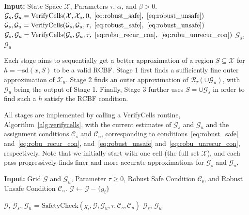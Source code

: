 \documentclass[letterpaper, 10 pt, conference]{ieeeconf}
\newcommand{\X}{\mathcal{X}}
\newcommand{\R}{\mathcal{R}}
\begin{document}
\begin{algorithm}[H]
\caption{VerifyRegion($\mathcal{X}, \tau$, $\alpha$, $\beta$)}
\label{alg:verifyregion}
\begin{algorithmic}[1]
\State \textbf{Input:} State Space $\mathcal{X}$, Parameters $\tau$, $\alpha$, and $\beta > 0$. 
\State $\mathcal{G}_{s}, \mathcal{G}_{u} = \mathrm{VerifyCells}(\mathcal{X}, \mathcal{X}_{u}, 0, ~\eqref{eq:robust_safe}, ~\eqref{eq:robust_unsafe})$
\State $\mathcal{G}_{s}, \mathcal{G}_{u} = \mathrm{VerifyCells}(\mathcal{G}_{s}, \mathcal{G}_{u}, \tau, ~\eqref{eq:robust_safe}, ~\eqref{eq:robust_unsafe})$
\State $\mathcal{G}_{s}, \mathcal{G}_{u} = \mathrm{VerifyCells}(\mathcal{G}_{s}, \mathcal{G}_{u}, \tau, ~\eqref{eq:robu_recur_con}, ~\eqref{eq:robu_unrecur_con})$
\State \Return $\mathcal{G}_{s}$, $\mathcal{G}_{u}$
\end{algorithmic}
\end{algorithm}
Each stage aims to sequentially get a better approximation of a region $S \subseteq \mathcal{X}$ for $h=-\mathrm{sd}(x,S)$ to be a valid RCBF.
Stage 1 first finds a sufficiently fine outer approximation of $\X_u$. Stage 2 finds an outer approximation of $\R_\tau(\cup \mathcal{G}_u)$, with $\mathcal{G}_u$ being the output of Stage 1. Finally, Stage 3 further uses $S = \cup \mathcal{G}_s$ in order to find such a $h$ satisfy the RCBF condition. 

All stages are implemented by calling a VerifyCells routine, Algorithm~\ref{alg:verifycells}, with the current estimates of $\mathcal{G}_s$ and $\mathcal{G}_u$ and the assignment conditions $\mathcal{C}_s$ and $\mathcal{C}_u$, corresponding to conditions~\eqref{eq:robust_safe} and~\eqref{eq:robu_recur_con}, and~\eqref{eq:robust_unsafe} and~\ref{eq:robu_unrecur_con}, respectively. Note that we initially start with one cell (the full set $\X$), and each pass progressively finds finer and more accurate approximations for $\mathcal{G}_s$ and $\mathcal{G}_u$.

\begin{algorithm}[htbp]
\caption{VerifyCells($\mathcal{G}, \mathcal{G}_{u}, \tau, \mathcal{C}_{\mathrm{s}},\mathcal{C}_{\mathrm{u}}$)}
\label{alg:verifycells}
\begin{algorithmic}[1]
\State \textbf{Input:} Grid $\mathcal{G}$ and $\mathcal{G}_{u}$, Parameter $\tau \ge 0$, Robust Safe Condition $\mathcal{C}_{\mathrm{s}}$, and Robust Unsafe Condition $\mathcal{C}_{\mathrm{u}}$. 
\State $\mathcal{G} \gets \mathcal{G} - \{g_{i}\}$

\State \hspace{-0.9em}$\mathcal{G}$, $\mathcal{G}_s$, $\mathcal{G}_{u}$ = $\mathrm{SafetyCheck}(g_i, \mathcal{G}, \mathcal{G}_u, \tau, \mathcal{C}_{s}, \mathcal{C}_{u})$
\EndFor
\EndWhile
\State \Return $\mathcal{G}_{s}$, $\mathcal{G}_{u}$
\end{algorithmic}
\end{algorithm}
\end{document}

